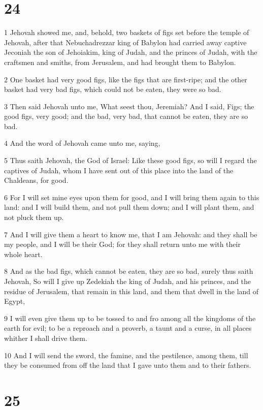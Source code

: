 \chapter{24}

\par 1 Jehovah showed me, and, behold, two baskets of figs set before the temple of Jehovah, after that Nebuchadrezzar king of Babylon had carried away captive Jeconiah the son of Jehoiakim, king of Judah, and the princes of Judah, with the craftsmen and smiths, from Jerusalem, and had brought them to Babylon.
\par 2 One basket had very good figs, like the figs that are first-ripe; and the other basket had very bad figs, which could not be eaten, they were so bad.
\par 3 Then said Jehovah unto me, What seest thou, Jeremiah? And I said, Figs; the good figs, very good; and the bad, very bad, that cannot be eaten, they are so bad.
\par 4 And the word of Jehovah came unto me, saying,
\par 5 Thus saith Jehovah, the God of Israel: Like these good figs, so will I regard the captives of Judah, whom I have sent out of this place into the land of the Chaldeans, for good.
\par 6 For I will set mine eyes upon them for good, and I will bring them again to this land: and I will build them, and not pull them down; and I will plant them, and not pluck them up.
\par 7 And I will give them a heart to know me, that I am Jehovah: and they shall be my people, and I will be their God; for they shall return unto me with their whole heart.
\par 8 And as the bad figs, which cannot be eaten, they are so bad, surely thus saith Jehovah, So will I give up Zedekiah the king of Judah, and his princes, and the residue of Jerusalem, that remain in this land, and them that dwell in the land of Egypt,
\par 9 I will even give them up to be tossed to and fro among all the kingdoms of the earth for evil; to be a reproach and a proverb, a taunt and a curse, in all places whither I shall drive them.
\par 10 And I will send the sword, the famine, and the pestilence, among them, till they be consumed from off the land that I gave unto them and to their fathers.

\chapter{25}

